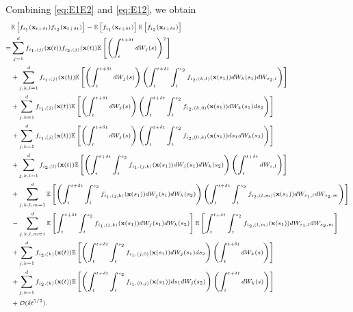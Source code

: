Combining \eqref{eq:E1E2} and \eqref{eq:E12}, we obtain 
%
\begin{equation} \label{eq:E12_E1E2}
\scriptsize
\begin{aligned}
&\mathbb{E} \left[ f_{i_1}(\mathbf{x}_{t + \delta t}) f_{i_2}(\mathbf{x}_{t + \delta t}) \right] 
- \mathbb{E} \left[ f_{i_1}(\mathbf{x}_{t + \delta t}) \right] \mathbb{E} \left[ f_{i_2}(\mathbf{x}_{t + \delta t}) \right] \\
=& 
 \sum_{j=1}^d f_{{i_1},(j)}(\mathbf{x}(t)) f_{{i_2},(j)}(\mathbf{x}(t)) \mathbb{E} \left[ \left( \int_t^{t + \delta t} dW_j(s) \right)^2 \right] \\
&+ \sum_{j,k,l=1}^d f_{{i_1},(j)}(\mathbf{x}(t)) \mathbb{E} \left[ \left( \int_t^{t + \delta t} dW_j(s) \right) \left( \int_t^{t+\delta t} \int_t^{s_2} f_{{i_2},(k,l)}(\mathbf{x}(s_1)) dW_k(s_1) dW_{s_2, l} \right) \right] \\
&+ \sum_{j,k=1}^d f_{{i_1},(j)}(\mathbf{x}(t)) \mathbb{E} \left[ \left( \int_t^{t + \delta t} dW_j(s) \right)\left( \int_t^{t+\delta t} \int_t^{s_2} f_{{i_2},(k,0)}(\mathbf{x}(s_1)) dW_k(s_1) ds_2 \right) \right]\\
&+ \sum_{j, k=1}^d f_{{i_1},(j)}(\mathbf{x}(t)) \mathbb{E} \left[ \left( \int_t^{t + \delta t} dW_j(s) \right) \left( \int_t^{t+\delta t} \int_t^{s_2} f_{{i_2},(0,k)}(\mathbf{x}(s_1)) ds_1 dW_k(s_2) \right) \right] \\
&+  \sum_{j, k, l=1}^d  f_{{i_2},(l)}(\mathbf{x}(t))\mathbb{E} \left[ \left( \int_t^{t+\delta t} \int_t^{s_2} f_{{i_1},(j,k)}(\mathbf{x}(s_1)) dW_j(s_1) dW_k(s_2) \right) \left( \int_t^{t + \delta t} dW_{s,l} \right) \right] \\
&+ \sum_{j, k, l, m=1}^d \mathbb{E} \left[ \left( \int_t^{t+\delta t} \int_t^{s_2} f_{{i_1},(j,k)}(\mathbf{x}(s_1)) dW_j(s_1) dW_k(s_2) \right) \left( \int_t^{t+\delta t} \int_t^{s_2} f_{{i_2},(l,m)}(\mathbf{x}(s_1)) dW_{s_1, l} dW_{s_2, m} \right) \right] \\
&- \sum_{j, k, l, m =1}^d \mathbb{E} \left[ \int_t^{t+\delta t} \int_t^{s_2} f_{{i_1},(j,k)}(\mathbf{x}(s_1)) dW_j(s_1) dW_k(s_2) \right] \mathbb{E} \left[ \int_t^{t+\delta t} \int_t^{s_2} f_{{i_2},(l,m)}(\mathbf{x}(s_1)) dW_{s_1, l} dW_{s_2, m} \right] \\
&+  \sum_{j, k=1}^d f_{{i_2},(k)}(\mathbf{x}(t)) \mathbb{E} \left[ \left( \int_t^{t+\delta t} \int_t^{s_2} f_{{i_1},(j,0)}(\mathbf{x}(s_1)) dW_j(s_1) ds_2  \right) \left( \int_t^{t + \delta t} dW_k(s) \right) \right]\\
&+   \sum_{j, k=1}^d  f_{{i_2},(k)}(\mathbf{x}(t)) \mathbb{E} \left[ \left( \int_t^{t+\delta t} \int_t^{s_2} f_{{i_1},(0,j)}(\mathbf{x}(s_1)) ds_1 dW_j(s_2)  \right) \left(\int_t^{t + \delta t} dW_k(s) \right) \right] \\
&+ \mathcal{O} (\delta t^{5/2}) .
\end{aligned}
\end{equation}
